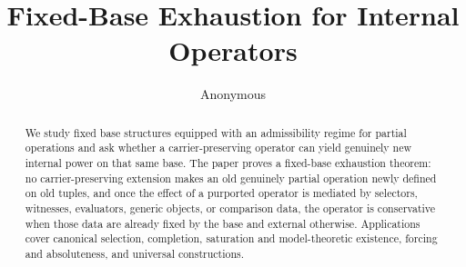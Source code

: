 \documentclass[reqno]{amsart}
\title[Fixed-Base Exhaustion]{Fixed-Base Exhaustion for Internal Operators}
\author[Anonymous]{Anonymous}
\date{}
\begin{document}
\begin{abstract}
We study fixed base structures equipped with an admissibility regime for partial operations and ask whether a carrier-preserving operator can yield genuinely new internal power on that same base. The paper proves a fixed-base exhaustion theorem: no carrier-preserving extension makes an old genuinely partial operation newly defined on old tuples, and once the effect of a purported operator is mediated by selectors, witnesses, evaluators, generic objects, or comparison data, the operator is conservative when those data are already fixed by the base and external otherwise. Applications cover canonical selection, completion, saturation and model-theoretic existence, forcing and absoluteness, and universal constructions.
\end{abstract}

\maketitle












\appendix





\end{document}
